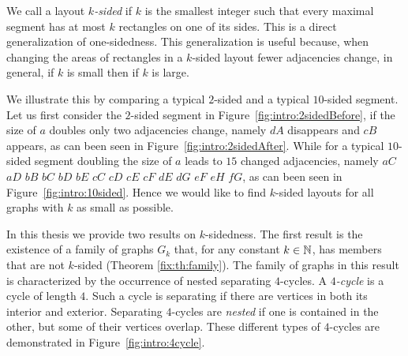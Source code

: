   We call a layout \emph{$k$-sided} if $k$ is the smallest integer such that every maximal segment has at most $k$ rectangles on one of its sides. This is a direct generalization of one-sidedness.
  This generalization is useful because, when changing the areas of rectangles in a $k$-sided layout fewer adjacencies change, in general, if $k$ is small then if $k$ is large.

  We illustrate this by comparing a typical $2$-sided and a typical $10$-sided segment.
  Let us first consider the $2$-sided segment in Figure~\ref{fig:intro:2sidedBefore}, if the size of $a$ doubles only two adjacencies change, namely $dA$ disappears and $cB$ appears, as can been seen in Figure~\ref{fig:intro:2sidedAfter}.
  While for a typical $10$-sided segment doubling the size of $a$ leads to $15$ changed adjacencies, namely $aC$ $aD$ $ bB$ $ bC$ $ bD$ $ bE$ $ cC$ $ cD$ $ cE$ $ cF$ $ dE$ $ dG$ $ eF$ $ eH$ $ fG$, as can been seen in Figure~\ref{fig:intro:10sided}.
  Hence we would like to find $k$-sided layouts for all graphs with $k$ as small as possible.


  In this thesis we provide two results on $k$-sidedness. The first result is the existence of a family of graphs $G_k$ that, for any constant $k \in \mathbb{N}$, has members that are not $k$-sided (Theorem \ref{fix:th:family}). The family of graphs in this result is characterized by the occurrence of nested separating $4$-cycles.
  A \emph{$4$-cycle} is a cycle of length $4$.
  Such a cycle is separating if there are vertices in both its interior and exterior.
  Separating $4$-cycles are \emph{nested} if one is contained in the other, but some of their vertices overlap. These different types of $4$-cycles are demonstrated in Figure~\ref{fig:intro:4cycle}.

